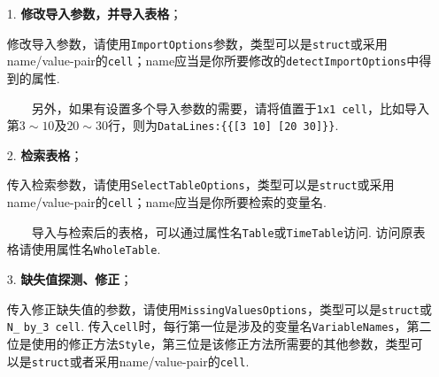 \documentclass[a4paper, titlepage]{article}
\begin{document}
    \begin{enumerate}
        \item [1.] \textbf{修改导入参数，并导入表格}；
        
        {\kaishu 
        修改导入参数，请使用\texttt{ImportOptions}参数，类型可以是\texttt{struct}或采用name/value-pair的\texttt{cell}；name应当是你所要修改的\texttt{detectImportOptions}中得到的属性. 
        
        　　另外，如果有设置多个导入参数的需要，请将值置于\texttt{1x1 cell}，比如导入第$3\sim 10$及$20\sim 30$行，则为\texttt{DataLines:\{\{[3 10] [20 30]\}\}}.
        }
        \item [2.] \textbf{检索表格}；
        
        {\kaishu
        传入检索参数，请使用\texttt{SelectTableOptions}，类型可以是\texttt{struct}或采用name/value-pair的\texttt{cell}；name应当是你所要检索的变量名.

        　　导入与检索后的表格，可以通过属性名\texttt{Table}或\texttt{TimeTable}访问. 访问原表格请使用属性名\texttt{WholeTable}. 
        }
        \item [3.] \textbf{缺失值探测、修正}；
        
        {\kaishu
        传入修正缺失值的参数，请使用\texttt{MissingValuesOptions}，类型可以是\texttt{struct}或\texttt{N\_} \texttt{by\_3 cell}. 传入\texttt{cell}时，每行第一位是涉及的变量名\texttt{VariableNames}，第二位是使用的修正方法\texttt{Style}，第三位是该修正方法所需要的其他参数，类型可以是\texttt{struct}或者采用name/value-pair的\texttt{cell}.

}
\end{enumerate}
\end{document}
